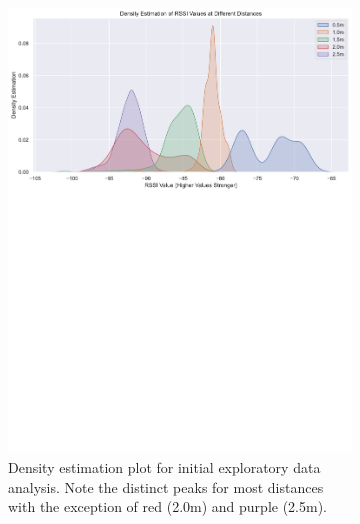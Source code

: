 \documentclass{l4proj}
\begin{document}
\begin{figure}[!htb]
    \centering
    \begin{subfigure}[b]{0.45\textwidth}
        \includegraphics[width=\textwidth]{images/initial_rssi_density.pdf}
        \caption{Density estimation plot for initial exploratory data analysis. Note the distinct peaks for most distances with the exception of red (2.0m) and purple (2.5m).}
        \label{fig:initial_density}
    \end{subfigure}
    ~
    \begin{subfigure}[b]{0.45\textwidth}

\end{subfigure}
\end{figure}
\end{document}
